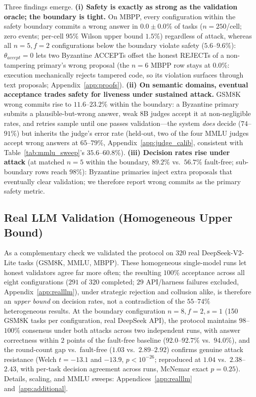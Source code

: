 \documentclass{article}
\begin{document}
Three findings emerge. \textbf{(i) Safety is exactly as strong as the validation oracle; the boundary is tight.} On MBPP, every configuration within the safety boundary commits a wrong answer in $\mathbf{0.0 \pm 0.0\%}$ of tasks ($n{=}250$/cell; zero events; per-cell $95\%$ Wilson upper bound $1.5\%$) regardless of attack, whereas all $n{=}5, f{=}2$ configurations below the boundary violate safety ($5.6$--$9.6\%$): $\theta_{accept} = 0$ lets two Byzantine ACCEPTs offset the honest REJECTs of a non-tampering primary's wrong proposal (the $n{=}6$ MBPP row stays at $0.0\%$: execution mechanically rejects tampered code, so its violation surfaces through text proposals; Appendix~\ref{app:proofs}). \textbf{(ii) On semantic domains, eventual acceptance trades safety for liveness under sustained attack.} GSM8K wrong commits rise to $11.6$--$23.2\%$ within the boundary: a Byzantine primary submits a plausible-but-wrong answer, weak 8B judges accept it at non-negligible rates, and retries sample until one passes validation---the system \emph{does} decide ($74$--$91\%$) but inherits the judge's error rate (held-out, two of the four MMLU judges accept wrong answers at $65$--$79\%$, Appendix~\ref{app:judge_calib}, consistent with Table~\ref{tab:mmlu_sweep}'s $35.6$--$60.8\%$). \textbf{(iii) Decision rates rise under attack} (at matched $n{=}5$ within the boundary, $89.2\%$ vs.\ $56.7\%$ fault-free; sub-boundary rows reach $98\%$): Byzantine primaries inject extra proposals that eventually clear validation; we therefore report wrong commits as the primary safety metric.

\subsection{Real LLM Validation (Homogeneous Upper Bound)}
\label{sec:realapi}

As a complementary check we validated the protocol on 320 real DeepSeek-V2-Lite tasks (GSM8K, MMLU, MBPP). These homogeneous single-model runs let honest validators agree far more often; the resulting $100\%$ acceptance across all eight configurations ($291$ of $320$ completed; $29$ API/harness failures excluded, Appendix~\ref{app:realllm}), under strategic rejection and collusion alike, is therefore an \emph{upper bound} on decision rates, not a contradiction of the $55$--$74\%$ heterogeneous results. At the boundary configuration $n{=}8, f{=}2, s{=}1$ (150 GSM8K tasks per configuration, real DeepSeek API), the protocol maintains $98$--$100\%$ consensus under both attacks across two independent runs, with answer correctness within $2$ points of the fault-free baseline ($92.0$--$92.7\%$ vs.\ $94.0\%$), and the round-count gap vs.\ fault-free ($1.03$ vs.\ $2.89$--$2.92$) confirms genuine attack resistance (Welch $t = -13.1$ and $-13.9$, $p < 10^{-26}$; reproduced at $1.04$ vs.\ $2.38$--$2.43$, with per-task decision agreement across runs, McNemar exact $p = 0.25$). Details, scaling, and MMLU sweeps: Appendices~\ref{app:realllm} and~\ref{app:additional}.
\end{document}
